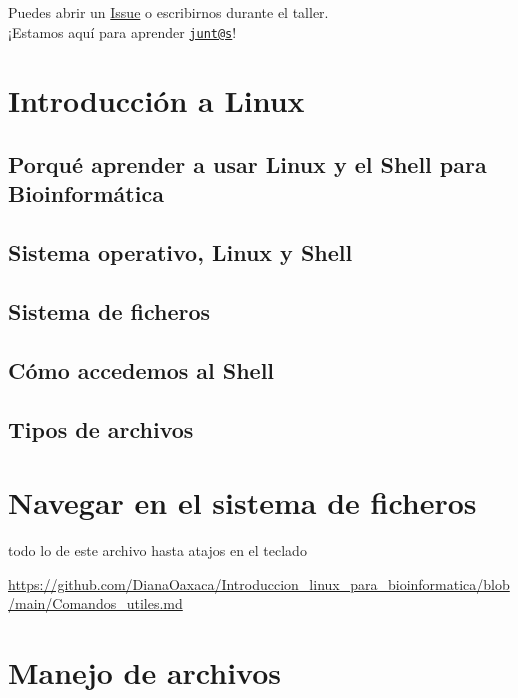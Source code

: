 \documentclass[
]{book}
\begin{document}
Puedes abrir un \href{https://github.com/}{Issue} o escribirnos durante el taller.\\
¡Estamos aquí para aprender \href{mailto:junt@s}{\nolinkurl{junt@s}}!

\chapter{Introducción a Linux}\label{introducciuxf3n-a-linux}

\section{Porqué aprender a usar Linux y el Shell para Bioinformática}\label{porquuxe9-aprender-a-usar-linux-y-el-shell-para-bioinformuxe1tica}

\section{Sistema operativo, Linux y Shell}\label{sistema-operativo-linux-y-shell}

\section{Sistema de ficheros}\label{sistema-de-ficheros}

\section{Cómo accedemos al Shell}\label{cuxf3mo-accedemos-al-shell}

\section{Tipos de archivos}\label{tipos-de-archivos}

\chapter{Navegar en el sistema de ficheros}\label{navegar-en-el-sistema-de-ficheros}

todo lo de este archivo hasta atajos en el teclado

\url{https://github.com/DianaOaxaca/Introduccion_linux_para_bioinformatica/blob/main/Comandos_utiles.md}

\chapter{Manejo de archivos}\label{manejo-de-archivos}
\end{document}
